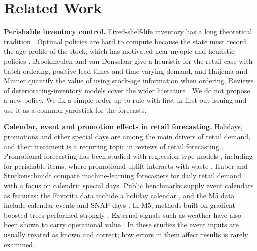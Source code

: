 \section{Related Work}
\label{sec:related}

\textbf{Perishable inventory control.} Fixed-shelf-life inventory has a long theoretical tradition \cite{nahmias1982perishable}. Optimal policies are hard to compute because the state must record the age profile of the stock, which has motivated near-myopic and heuristic policies \cite{nandakumar1993near}. Broekmeulen and van Donselaar \cite{broekmeulen2009heuristic} give a heuristic for the retail case with batch ordering, positive lead times and time-varying demand, and Haijema and Minner \cite{haijema2019improved} quantify the value of using stock-age information when ordering. Reviews of deteriorating-inventory models cover the wider literature \cite{bakker2012review, janssen2016literature}. We do not propose a new policy. We fix a simple order-up-to rule with first-in-first-out issuing and use it as a common yardstick for the forecasts.

\textbf{Calendar, event and promotion effects in retail forecasting.} Holidays, promotions and other special days are among the main drivers of retail demand, and their treatment is a recurring topic in reviews of retail forecasting \cite{fildes2022retail}. Promotional forecasting has been studied with regression-type models \cite{trapero2015identification}, including for perishable items, where promotional uplift interacts with waste \cite{vandonselaar2016analysis}. Huber and Stuckenschmidt \cite{huber2020daily} compare machine-learning forecasters for daily retail demand with a focus on calendric special days. Public benchmarks supply event calendars as features: the Favorita data include a holiday calendar \cite{favorita2018kaggle}, and the M5 data include calendar events and SNAP days \cite{makridakis2022m5background}. In M5, methods built on gradient-boosted trees \cite{friedman2001gbm, ke2017lightgbm} performed strongly \cite{makridakis2022m5}. External signals such as weather have also been shown to carry operational value \cite{steinker2017value}. In these studies the event inputs are usually treated as known and correct; how errors in them affect results is rarely examined.

